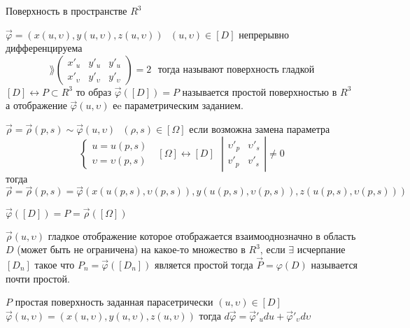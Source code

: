 \begin{title}
  Поверхность в пространстве $R^3$
\end{title}

\begin{define}
  $\vec \varphi = (x(u, \upsilon) , y(u, \upsilon), z(u, \upsilon)) ~~~
  (u, \upsilon) \in [D]$ непрерывно дифференцируема
  $$
  \rang \left(
  \begin{array}{ccc}
    x'_u & y'_u & y'_u \\
    x'_{\upsilon} & y'_{\upsilon} & y'_{\upsilon}
  \end{array}
  \right) = 2 ~~~
  \text{тогда называют поверхность гладкой}
  $$
  $[D] \leftrightarrow P \subset R^3$ то образ $\vec \varphi([D]) = P$
  называется простой поверхностью в $R^3$ а отображение
  $\vec \varphi(u, \upsilon)$ еe параметрическим заданием.
\end{define}

\begin{define}
  $\vec \rho = \vec \rho(p,s) \sim \vec \varphi(u, \upsilon) ~~~
  (\rho, s) \in [\Omega]$ если возможна замена параметра
  $$
  \left\{
  \begin{array}{l}
    u = u(p,s) \\
    \upsilon = \upsilon(p,s)
  \end{array}
  \right. ~~~ [\Omega] \leftrightarrow [D] ~~~
  \left|
  \begin{array}{cc}
    \upsilon'_p & \upsilon'_s \\
    v'_p & v'_s
  \end{array}
  \right| \not = 0
  $$
  тогда $\vec \rho = \vec \rho(p,s) = \vec \varphi (x(u(p,s), \upsilon(p,s)),
  y(u(p,s), \upsilon(p,s)), z(u(p,s), \upsilon(p,s)))$

  $\vec \varphi ([D]) = P = \vec \rho([\Omega])$
\end{define}

\begin{define}
  $\vec \rho(u, \upsilon)$ гладкое отображение которое отображается
  взаимооднозначно в область $D$
  (может быть не ограничена) на какое-то множество в $R^3$, если $\exists$
  исчерпание $[D_n]$ такое что $P_n = \vec \varphi ([D_n])$
  является простой тогда $\vec P =
  \varphi(D)$ называется почти простой.
\end{define}

\begin{theorem}
  $P$ простая поверхность заданная парасетрически $(u, \upsilon) \in [D]$
  $\vec \varphi (u, \upsilon) = (x(u, \upsilon), y(u, \upsilon),
  z(u, \upsilon))$ тогда $d\vec \varphi = \vec \varphi'_udu +
  \vec \varphi'_{\upsilon} d\upsilon$
\end{theorem}

